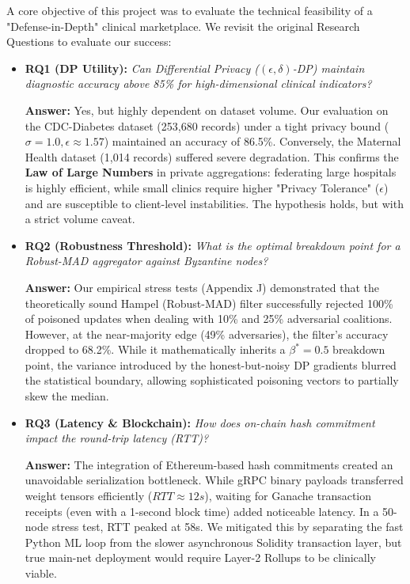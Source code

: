 \documentclass[10pt, a4paper, twocolumn]{article}
\begin{document}
A core objective of this project was to evaluate the technical feasibility of a "Defense-in-Depth" clinical marketplace. We revisit the original Research Questions to evaluate our success:

\begin{itemize}
    \item \textbf{RQ1 (DP Utility):} \textit{Can Differential Privacy ($(\epsilon, \delta)$-DP) maintain diagnostic accuracy above 85\% for high-dimensional clinical indicators?} 
    
    \textbf{Answer:} Yes, but highly dependent on dataset volume. Our evaluation on the CDC-Diabetes dataset (253,680 records) under a tight privacy bound ($\sigma=1.0, \epsilon \approx 1.57$) maintained an accuracy of 86.5\%. Conversely, the Maternal Health dataset (1,014 records) suffered severe degradation. This confirms the \textbf{Law of Large Numbers} in private aggregations: federating large hospitals is highly efficient, while small clinics require higher "Privacy Tolerance" ($\epsilon$) and are susceptible to client-level instabilities. The hypothesis holds, but with a strict volume caveat.

    \item \textbf{RQ2 (Robustness Threshold):} \textit{What is the optimal breakdown point for a Robust-MAD aggregator against Byzantine nodes?}
    
    \textbf{Answer:} Our empirical stress tests (Appendix J) demonstrated that the theoretically sound Hampel (Robust-MAD) filter successfully rejected 100\% of poisoned updates when dealing with 10\% and 25\% adversarial coalitions. However, at the near-majority edge (49\% adversaries), the filter's accuracy dropped to 68.2\%. While it mathematically inherits a $\beta^* = 0.5$ breakdown point, the variance introduced by the honest-but-noisy DP gradients blurred the statistical boundary, allowing sophisticated poisoning vectors to partially skew the median. 

    \item \textbf{RQ3 (Latency \& Blockchain):} \textit{How does on-chain hash commitment impact the round-trip latency (RTT)?}
    
    \textbf{Answer:} The integration of Ethereum-based hash commitments created an unavoidable serialization bottleneck. While gRPC binary payloads transferred weight tensors efficiently ($RTT \approx 12s$), waiting for Ganache transaction receipts (even with a 1-second block time) added noticeable latency. In a 50-node stress test, RTT peaked at 58s. We mitigated this by separating the fast Python ML loop from the slower asynchronous Solidity transaction layer, but true main-net deployment would require Layer-2 Rollups to be clinically viable.
\end{itemize}
\end{document}
